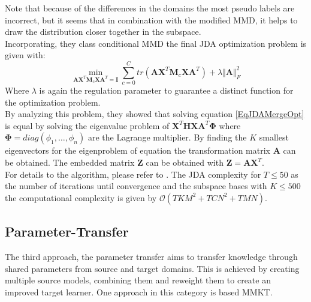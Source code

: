 Note that because of the differences in the domains the most pseudo labels are incorrect, but it seems that in combination with the modified \acs{MMD}, it helps to draw the distribution closer together in the subspace.\cite{Long.}\\
Incorporating, they class conditional \acs{MMD} the final \acs{JDA} optimization problem is given with:\cite{Long.}
\begin{equation}\label{EqJDAMergeOpt}
\min_{\mathbf{A}\mathbf{X}^T\mathbf{M}_c\mathbf{X}\mathbf{A}^T=\mathbf{I}} \sum_{c=0}^{C} tr(\mathbf{A}\mathbf{X}^T\mathbf{M}_c\mathbf{X}\mathbf{A}^T) + \lambda \Vert\mathbf{A}\Vert^2_F
\end{equation}
Where $\lambda$ is again the regulation parameter to guarantee a distinct function for the optimization problem.\\
By analyzing this problem, they showed that solving equation \eqref{EqJDAMergeOpt} is equal by solving the eigenvalue problem of $\mathbf{X}^T\mathbf{HX}\mathbf{A}^T\boldsymbol{\Phi}$ where $\boldsymbol{\Phi} = diag(\phi_1,\dots,\phi_n)$ are the Lagrange multiplier. By finding the $K$ smallest eigenvectors for the eigenproblem of equation the transformation matrix $\mathbf{A}$ can be obtained. The embedded matrix $\mathbf{Z}$ can be obtained with $\mathbf{Z} = \mathbf{A}\mathbf{X}^T$.\cite{Long.}\\
For details to the algorithm, please refer to \cite{Long.}.
The \acs{JDA} complexity for $T\le 50$ as the number of iterations until convergence and the subspace bases with $K\le 500$ the computational complexity is given by $\mathcal{O}(TKM^2+TCN^2+TMN)$.\cite{Long.}
\subsection{Parameter-Transfer}\label{TlSubSecPara}
The third approach, the parameter transfer aims to transfer knowledge through shared parameters from source and target domains.
This is achieved by creating multiple source models, combining them and reweight them to create an improved target learner.
One approach in this category is based \ac{MMKT}.\cite[p. 7-8]{Weiss.2016}
